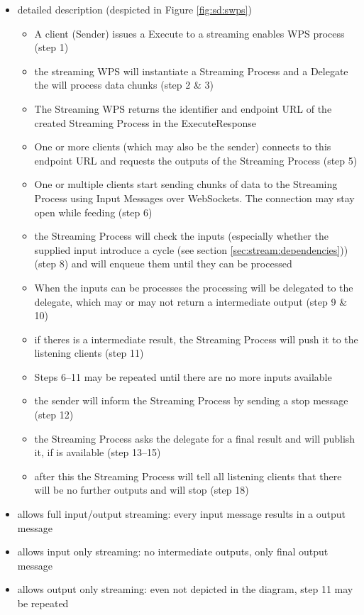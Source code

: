 \begin{itemize}
			\item detailed description (despicted in Figure \ref{fig:sd:swps})
			\begin{itemize}
				\item A client (Sender) issues a Execute to a streaming enables WPS process (step 1)
				\item the streaming WPS will instantiate a Streaming Process and a Delegate the will process data chunks (step 2 \& 3)
				\item The Streaming WPS returns the identifier and endpoint URL of the created Streaming Process in the ExecuteResponse
				\item One or more clients (which may also be the sender) connects to this endpoint URL and requests the outputs of the Streaming Process (step 5)
				\item One or multiple clients start sending chunks of data to the Streaming Process using Input Messages over WebSockets. The connection may stay open while feeding (step 6)
				\item the Streaming Process will check the inputs (especially whether the supplied input introduce a cycle (see section \ref{sec:stream:dependencies})) (step 8) and will enqueue them until they can be processed
				\item When the inputs can be processes the processing will be delegated to the delegate, which may or may not return a intermediate output  (step 9 \& 10)
				\item if theres is a intermediate result, the Streaming Process will push it to the listening clients (step 11)
				\item Steps 6--11 may be repeated until there are no more inputs available
				\item the sender will inform the Streaming Process by sending a stop message (step 12)
				\item the Streaming Process asks the delegate for a final result and will publish it, if is available (step 13--15)
				\item after this the Streaming Process will tell all listening clients that there will be no further outputs and will stop (step 18)
			\end{itemize}
			\item allows full input/output streaming: every input message results in a output message
			\item allows input only streaming: no intermediate outputs, only final output message
			\item allows output only streaming: even not depicted in the diagram, step 11 may be repeated

\end{itemize}
